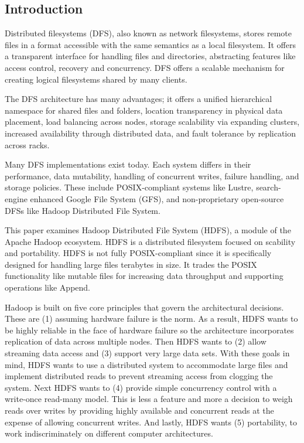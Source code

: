 \documentclass[11pt, a4paper]{article}
\begin{document}
\begin{multicols*}{2}


\section{Introduction}


Distributed filesystems (DFS), also known as network filesystems, stores remote files in a format accessible with the same semantics as a local filesystem. It offers a transparent interface for handling files and directories, abstracting features like access control, recovery and concurrency. DFS offers a scalable mechanism for creating logical filesystems shared by many clients.

The DFS architecture has many advantages; it offers a unified hierarchical namespace for shared files and folders, location transparency in physical data placement, load balancing across nodes, storage scalability via expanding clusters, increased availability through distributed data, and fault tolerance by replication across racks.

Many DFS implementations exist today. Each system differs in their performance, data mutability, handling of concurrent writes, failure handling, and storage policies. These include POSIX-compliant systems like Lustre, search-engine enhanced Google File System (GFS), and non-proprietary open-source DFSs like Hadoop Distributed File System.

This paper examines Hadoop Distributed File System (HDFS), a module of the Apache Hadoop ecosystem. HDFS is a distributed filesystem focused on scability and portability. HDFS is not fully POSIX-compliant since it is specifically designed for handling large files terabytes in size. It trades the POSIX functionality like mutable files for increasing data throughput and supporting operations like Append.


Hadoop is built on five core principles that govern the architectural decisions. These are (1) assuming hardware failure is the norm. As a result, HDFS wants to be highly reliable in the face of hardware failure so the architecture incorporates replication of data across multiple nodes. Then HDFS wants to (2) allow streaming data access and (3) support very large data sets. With these goals in mind, HDFS wants to use a distributed system to accommodate large files and implement distributed reads to prevent streaming access from clogging the system. Next HDFS wants to (4) provide simple concurrency control with a write-once read-many model. This is less a feature and more a decision to weigh reads over writes by providing highly available and concurrent reads at the expense of allowing concurrent writes. And lastly, HDFS wants (5) portability, to work indiscriminately on different computer architectures.


\end{multicols*}
\end{document}
